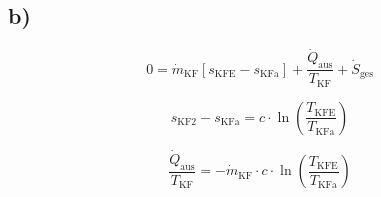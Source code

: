 

\subsection*{b)}

\[
0 = \dot{m}_{\text{KF}} \left[ s_{\text{KFE}} - s_{\text{KFa}} \right] + \frac{\dot{Q}_{\text{aus}}}{T_{\text{KF}}} + \dot{S}_{\text{ges}}
\]

\[
s_{\text{KF2}} - s_{\text{KFa}} = c \cdot \ln \left( \frac{T_{\text{KFE}}}{T_{\text{KFa}}} \right)
\]

\[
\frac{\dot{Q}_{\text{aus}}}{T_{\text{KF}}} = -\dot{m}_{\text{KF}} \cdot c \cdot \ln \left( \frac{T_{\text{KFE}}}{T_{\text{KFa}}} \right)
\]